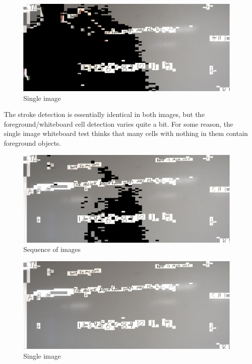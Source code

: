 \documentclass[]{article}
\begin{document}
\begin{figure}[H]
\centering
\includegraphics[scale=0.25]{images/griffin_foreground2}
\caption{Single image}
\end{figure}	
	
	The stroke detection is essentially identical in both images, but the foreground/whiteboard cell detection varies quite a bit.  For some reason, the single image whiteboard test thinks that many cells with nothing in them contain foreground objects.
	
\begin{figure}[H]
\centering
\includegraphics[scale=0.25]{images/emptyboard_overtime}
\caption{Sequence of images}
\end{figure}
		
\begin{figure}[H]
\centering
\includegraphics[scale=0.25]{images/emptyboard_single}
\caption{Single image}
\end{figure}
\end{document}
